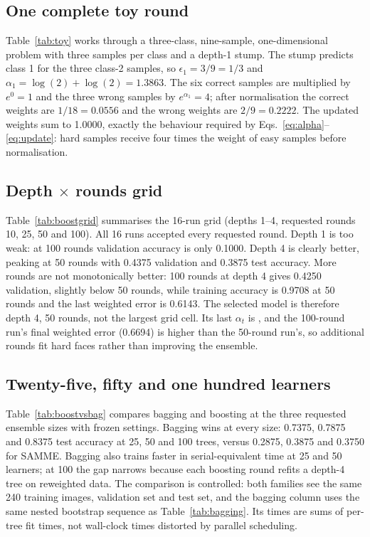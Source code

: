 \documentclass[10pt,twocolumn,letterpaper]{article}
\begin{document}
\subsection{One complete toy round}

Table~\ref{tab:toy} works through a three-class, nine-sample, one-dimensional
problem with three samples per class and a depth-1 stump.  The stump predicts
class 1 for the three class-2 samples, so $\epsilon_1=3/9=1/3$ and
$\alpha_1=\log(2)+\log(2)=1.3863$.  The six correct samples are multiplied by
$e^0=1$ and the three wrong samples by $e^{\alpha_1}=4$; after normalisation the
correct weights are $1/18=0.0556$ and the wrong weights are $2/9=0.2222$.  The
updated weights sum to 1.0000, exactly the behaviour required by
Eqs.~\eqref{eq:alpha}--\eqref{eq:update}: hard samples receive four times the
weight of easy samples before normalisation.



\subsection{Depth $\times$ rounds grid}

Table~\ref{tab:boostgrid} summarises the 16-run grid (depths 1--4, requested
rounds 10, 25, 50 and 100).  All 16 runs accepted every requested round.  Depth
1 is too weak: at 100 rounds validation accuracy is only 0.1000.  Depth 4 is
clearly better, peaking at 50 rounds with 0.4375 validation and 0.3875 test
accuracy.  More rounds are not monotonically better: 100 rounds at depth 4
gives 0.4250 validation, slightly below 50 rounds, while training accuracy is
0.9708 at 50 rounds and the last weighted error is 0.6143.  The selected model
is therefore depth 4, 50 rounds, not the largest grid cell.  Its last
$\alpha_t$ is \BoostAlphaLast, and the 100-round run's final weighted error
(0.6694) is higher than the 50-round run's, so additional rounds fit hard faces
rather than improving the ensemble.



\subsection{Twenty-five, fifty and one hundred learners}

Table~\ref{tab:boostvsbag} compares bagging and boosting at the three requested
ensemble sizes with frozen settings.  Bagging wins at every size: 0.7375,
0.7875 and 0.8375 test accuracy at 25, 50 and 100 trees, versus 0.2875, 0.3875
and 0.3750 for SAMME.  Bagging also trains faster in serial-equivalent time at
25 and 50 learners; at 100 the gap narrows because each boosting round refits a
depth-4 tree on reweighted data.  The comparison is controlled: both families
see the same 240 training images, validation set and test set, and the bagging
column uses the same nested bootstrap sequence as Table~\ref{tab:bagging}.  Its
times are sums of per-tree fit times, not wall-clock times distorted by parallel
scheduling.
\end{document}
